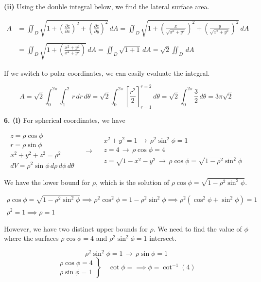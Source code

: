 \documentclass{article}
\begin{document}
\textbf{(ii)} Using the double integral below, we find the lateral surface area.

\begin{align*}
A&=\iint_D\sqrt{1+\left(\frac{\partial z}{\partial x}\right)^2 +\left(\frac{\partial z}{\partial y}\right)^2}\,dA= \iint_D\sqrt{1+\left(\frac{x}{\sqrt{x^2+y^2}}\right)^2 +\left(\frac{y}{\sqrt{x^2+y^2}}\right)^2}\,dA \\\\&=\iint_D\sqrt{1+\left(\frac{x^2+y^2}{x^2+y^2}\right)}\,dA=\iint_D\sqrt{1+1}\,dA=\sqrt{2}\iint_D\,dA
\end{align*}

If we switch to polar coordinates, we can easily evaluate the integral.

\[A=\sqrt2\int_0^{2\pi}\int_1^2\,r\,dr\,d\theta=\sqrt2\int_0^{2\pi}\left[\frac{r^2}2\right]_{r=1}^{r=2}\,d\theta=\sqrt2\int_0^{2\pi}\frac32\,d\theta=\boxed{3\pi\sqrt2}\]

\newpage

\textbf{6. (i)} For spherical coordinates, we have

\[
\begin{array}{c}
z=\rho\cos\phi\\
r=\rho\sin\phi\\
x^2+y^2+z^2=\rho^2\\
dV=\rho^2\sin\phi\,d\rho\,d\phi\,d\theta
\end{array}\quad\rightarrow\quad
\begin{array}{c}
x^2+y^2=1\,\rightarrow\,\rho^2\sin^2\phi = 1\\
z=4\,\rightarrow\,\rho\cos\phi=4\\
z=\sqrt{1-x^2-y^2}\,\rightarrow\,\rho\cos\phi=\sqrt{1-\rho^2\sin^2\phi}
\end{array}
\]

We have the lower bound for $\rho$, which is the solution of $\rho\cos\phi=\sqrt{1-\rho^2\sin^2\phi}$.

\[
\begin{array}{c}
\rho\cos\phi=\sqrt{1-\rho^2\sin^2\phi}\implies\rho^2\cos^2\phi=1-\rho^2\sin^2\phi\implies
\rho^2\left(\cos^2\phi+\sin^2\phi\right)=1\\
\rho^2=1\implies\rho=1
\end{array}
\]

However, we have two distinct upper bounds for $\rho$. We need to find the value of $\phi$ where the surfaces $\rho\cos\phi = 4$ and $\rho^2\sin^2\phi=1$ intersect.

\[
\rho^2\sin^2\phi=1 \,\rightarrow\,\rho\sin\phi = 1
\]
\[
\left.
\begin{array}{c}
\rho\cos\phi=4\\
\rho\sin\phi=1
\end{array}
\right\}\quad\cot\phi=\implies\phi=\cot^{-1}(4)
\]
\end{document}
